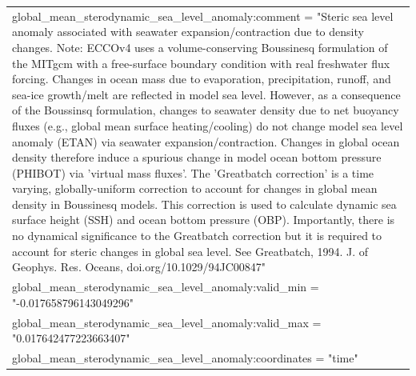 \begin{longtable}{|p{\textwidth}|}
\hspace{0.5cm}\hspace{0.5cm}global\_mean\_sterodynamic\_sea\_level\_anomaly:comment = "Steric sea level anomaly associated with seawater expansion/contraction due to density changes. Note: ECCOv4 uses a volume-conserving Boussinesq formulation of the MITgcm with a free-surface boundary condition with real freshwater flux forcing. Changes in ocean mass due to evaporation, precipitation, runoff, and sea-ice growth/melt are reflected in model sea level. However, as a consequence of the Boussinsq formulation, changes to seawater density due to net buoyancy fluxes (e.g., global mean surface heating/cooling) do not change model sea level anomaly (ETAN) via seawater expansion/contraction. Changes in global ocean density therefore induce a spurious change in model ocean bottom pressure (PHIBOT) via 'virtual mass fluxes'. The 'Greatbatch correction' is a time varying, globally-uniform correction to account for changes in global mean density in Boussinesq models. This correction is used to calculate dynamic sea surface height (SSH) and ocean bottom pressure (OBP). Importantly, there is no dynamical significance to the Greatbatch correction but it is required to account for steric changes in global sea level. See Greatbatch, 1994. J. of Geophys. Res. Oceans, doi.org/10.1029/94JC00847"\\
\hspace{0.5cm}\hspace{0.5cm}global\_mean\_sterodynamic\_sea\_level\_anomaly:valid\_min = "-0.017658796143049296"\\
\hspace{0.5cm}\hspace{0.5cm}global\_mean\_sterodynamic\_sea\_level\_anomaly:valid\_max = "0.017642477223663407"\\
\hspace{0.5cm}\hspace{0.5cm}global\_mean\_sterodynamic\_sea\_level\_anomaly:coordinates = "time"\\
\hline
\end{longtable}